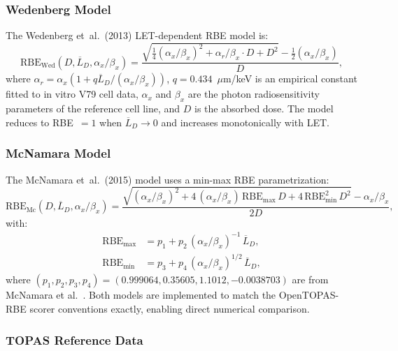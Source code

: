 \subsubsection{Wedenberg Model}
\label{sec:wedenberg}

The Wedenberg et~al.\ (2013) LET-dependent RBE model is:
\begin{equation}
  \mathrm{RBE}_\mathrm{Wed}(D, \overline{L}_D, \alpha_x/\beta_x) =
    \frac{\sqrt{\tfrac{1}{4}(\alpha_x/\beta_x)^2 +
          \alpha_r/\beta_x \cdot D + D^2} - \tfrac{1}{2}(\alpha_x/\beta_x)}{D},
  \label{eq:wedenberg}
\end{equation}
where $\alpha_r = \alpha_x \left(1 + q \overline{L}_D / (\alpha_x/\beta_x)\right)$,
$q = 0.434$~$\mu$m/keV is an empirical constant fitted to in vitro V79 cell data,
$\alpha_x$ and $\beta_x$ are the photon radiosensitivity parameters of the
reference cell line, and $D$ is the absorbed dose.
The model reduces to RBE~$= 1$ when $\overline{L}_D \to 0$ and
increases monotonically with LET.

\subsubsection{McNamara Model}
\label{sec:mcnamara}

The McNamara et~al.\ (2015) model uses a min-max RBE parametrization:
\begin{equation}
  \mathrm{RBE}_\mathrm{Mc}(D, \overline{L}_D, \alpha_x/\beta_x) =
    \frac{\sqrt{(\alpha_x/\beta_x)^2 + 4\,(\alpha_x/\beta_x)\,
          \mathrm{RBE}_\mathrm{max}\,D + 4\,\mathrm{RBE}_\mathrm{min}^2\,D^2}
          - \alpha_x/\beta_x}{2D},
  \label{eq:mcnamara}
\end{equation}
with:
\begin{align}
  \mathrm{RBE}_\mathrm{max} &= p_1 + p_2\,(\alpha_x/\beta_x)^{-1}\,
                                \overline{L}_D, \label{eq:rbemax}\\
  \mathrm{RBE}_\mathrm{min} &= p_3 + p_4\,(\alpha_x/\beta_x)^{1/2}\,
                                \overline{L}_D, \label{eq:rbemin}
\end{align}
where $(p_1, p_2, p_3, p_4) = (0.999064, 0.35605, 1.1012, -0.0038703)$
are from McNamara et al.\ \cite{mcnamara2015}.
Both models are implemented to match the OpenTOPAS-RBE scorer
conventions exactly, enabling direct numerical comparison.

\subsubsection{TOPAS Reference Data}
\label{sec:topasref}

